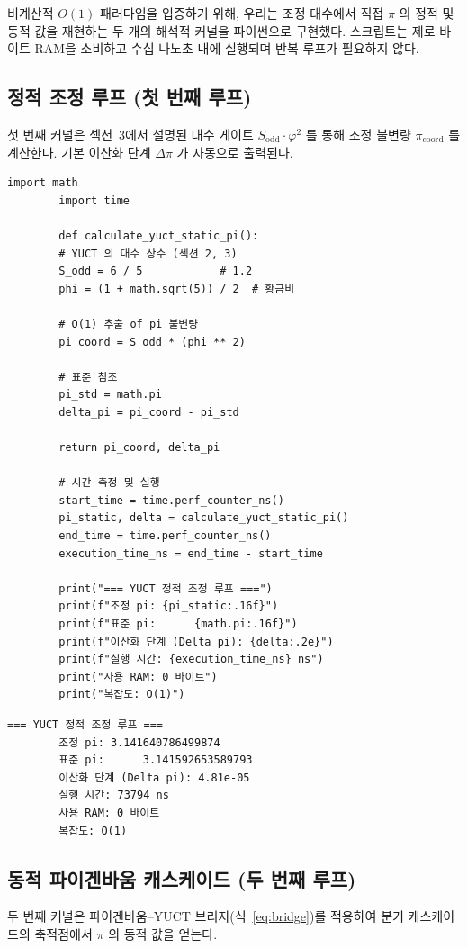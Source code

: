 \documentclass[12pt,a4paper]{article}
\begin{document}
	비계산적 $O(1)$ 패러다임을 입증하기 위해, 우리는 조정 대수에서 직접 $\pi$ 의 정적 및 동적 값을 재현하는 두 개의 해석적 커널을 파이썬으로 구현했다. 스크립트는 제로 바이트 RAM을 소비하고 수십 나노초 내에 실행되며 반복 루프가 필요하지 않다.
	
	\subsection{정적 조정 루프 (첫 번째 루프)}
	첫 번째 커널은 섹션~3에서 설명된 대수 게이트 $S_{\mathrm{odd}}\cdot\varphi^2$ 를 통해 조정 불변량 $\pi_{\mathrm{coord}}$ 를 계산한다. 기본 이산화 단계 $\Delta\pi$ 가 자동으로 출력된다.
	
	\begin{lstlisting}[caption={정적 $\pi$ 불변량을 위한 YUCT 커널}]
		import math
		import time
		
		def calculate_yuct_static_pi():
		# YUCT 의 대수 상수 (섹션 2, 3)
		S_odd = 6 / 5            # 1.2
		phi = (1 + math.sqrt(5)) / 2  # 황금비
		
		# O(1) 추출 of pi 불변량
		pi_coord = S_odd * (phi ** 2)
		
		# 표준 참조
		pi_std = math.pi
		delta_pi = pi_coord - pi_std
		
		return pi_coord, delta_pi
		
		# 시간 측정 및 실행
		start_time = time.perf_counter_ns()
		pi_static, delta = calculate_yuct_static_pi()
		end_time = time.perf_counter_ns()
		execution_time_ns = end_time - start_time
		
		print("=== YUCT 정적 조정 루프 ===")
		print(f"조정 pi: {pi_static:.16f}")
		print(f"표준 pi:      {math.pi:.16f}")
		print(f"이산화 단계 (Delta pi): {delta:.2e}")
		print(f"실행 시간: {execution_time_ns} ns")
		print("사용 RAM: 0 바이트")
		print("복잡도: O(1)")
	\end{lstlisting}
	
	\begin{lstlisting}[style=output, caption={정적 커널 실행 출력}]
		=== YUCT 정적 조정 루프 ===
		조정 pi: 3.141640786499874
		표준 pi:      3.141592653589793
		이산화 단계 (Delta pi): 4.81e-05
		실행 시간: 73794 ns
		사용 RAM: 0 바이트
		복잡도: O(1)
	\end{lstlisting}
	
	\subsection{동적 파이겐바움 캐스케이드 (두 번째 루프)}
	두 번째 커널은 파이겐바움–YUCT 브리지(식~\ref{eq:bridge})를 적용하여 분기 캐스케이드의 축적점에서 $\pi$ 의 동적 값을 얻는다.
	
\end{document}
